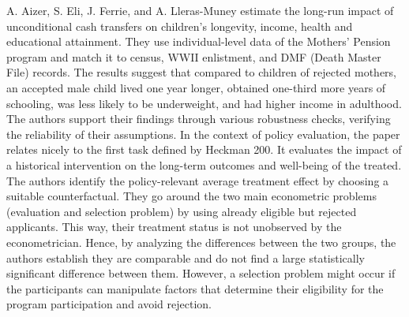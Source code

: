 A. Aizer, S. Eli, J. Ferrie, and A. Lleras-Muney estimate the long-run
impact of unconditional cash transfers on children's longevity, income,
health and educational attainment. They use individual-level data of
the Mothers' Pension program and match it to census, WWII enlistment,
and DMF (Death Master File) records. The results suggest that compared
to children of rejected mothers, an accepted male child lived one year
longer, obtained one-third more years of schooling, was less likely to
be underweight, and had higher income in adulthood. The authors support their
findings through various robustness checks, verifying the reliability
of their assumptions. In the context of policy evaluation, the paper 
relates nicely to the first task defined by Heckman 200. It evaluates the impact of a historical intervention on the long-term outcomes and well-being of the treated. The authors identify the policy-relevant average treatment effect by choosing a suitable counterfactual. They go around the two main econometric problems (evaluation and selection problem) by using already eligible but rejected applicants. This way, their treatment status is not unobserved by the econometrician. Hence, by analyzing the differences between the two groups, the authors establish they are comparable and do not find a large statistically significant difference between them. However, a selection problem might occur if the participants can manipulate factors that determine their eligibility for the program participation and avoid rejection.